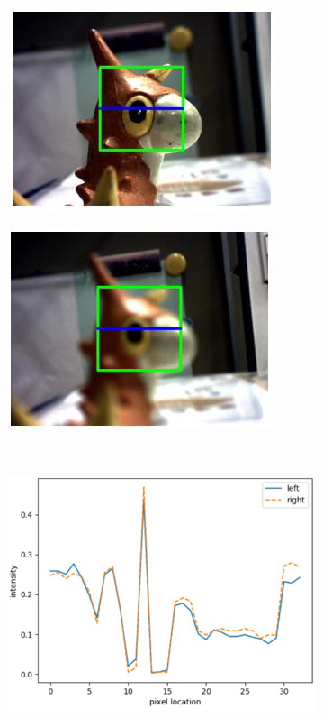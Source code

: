 \begin{figure}[!htbp]
	\begin{subfigure}[t]{0.45\linewidth}
		\centering
		\includegraphics[width=.85\linewidth]{my_folder/images/phase_image_1}
		\caption{}
		\label{fig:phase_image-a}
	\end{subfigure}
	\hfill
	\begin{subfigure}[t]{0.45\linewidth}
		\centering
		\includegraphics[width=.85\linewidth]{my_folder/images/phase_image_2}
		\caption{}
		\label{fig:phase_image-b}
	\end{subfigure}
	\\
	\begin{subfigure}[t]{0.45\linewidth}
		\centering
		\includegraphics[width=.85\linewidth]{my_folder/images/phase_image_3}

\end{subfigure}
\end{figure}
